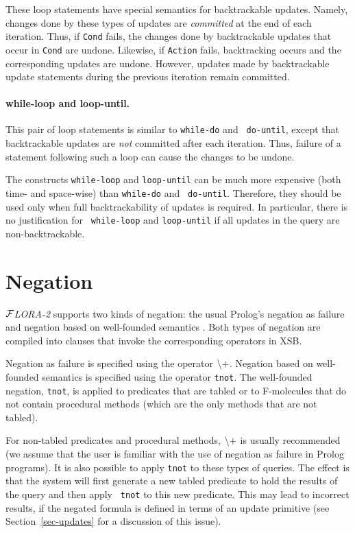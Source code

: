 \documentclass[11pt]{article}
\newcommand{\FLORA}{{\mbox{${\cal F}${\small\it LORA}\rm\emph{-2}}}\xspace}
\newcommand{\NAF}{{$\tt\backslash +$}\xspace}
\begin{document}
These loop statements have special semantics for backtrackable updates.
Namely, changes done by these types of updates are \emph{committed} at the
end of each iteration. Thus, if {\tt Cond} fails, the changes done by
backtrackable updates that occur in {\tt Cond} are undone. Likewise, if
{\tt Action} fails, backtracking occurs and the corresponding updates are
undone. However, updates made by backtrackable update statements during the
previous iteration remain committed.


\paragraph{while-loop and loop-until.}
This pair of loop statements is similar to {\tt while-do} and {\tt
  do-until}, except that backtrackable updates are \emph{not} committed
after each iteration. Thus, failure of a statement following such a loop
can cause the changes to be undone.

The constructs {\tt while-loop} and {\tt loop-until} can be much more
expensive (both time- and space-wise) than {\tt while-do} and {\tt
  do-until}. Therefore, they should be used only when full backtrackability
of updates is required. In particular, there is no justification for {\tt
  while-loop} and {\tt loop-until} if all updates in the query are
non-backtrackable.


\section{Negation} \label{sec:negation}


\FLORA supports two kinds of negation: the usual Prolog's
negation as failure \cite{Cla78} and negation based on well-founded
semantics \cite{gelder-alternating-89,gelder-ross-schlipf-91}. Both types
of negation are compiled into clauses that invoke the corresponding
operators in XSB.

Negation as failure is specified using the operator \NAF.  Negation based
on well-founded semantics is specified using the operator {\tt tnot}. The
well-founded negation, {\tt tnot}, is applied to predicates that are tabled
or to F-molecules that do not contain procedural methods (which are the
only methods that are not tabled).

For non-tabled predicates and procedural methods, \NAF is usually
recommended (we assume that the user is familiar with the use of negation
as failure in Prolog programs).  It is also possible to apply {\tt tnot} to
these types of queries.  The effect is that the system will first generate
a new tabled predicate to hold the results of the query and then apply {\tt
  tnot} to this new predicate. This may lead to incorrect results,
if the negated formula is defined in terms of an update
primitive (see Section~\ref{sec-updates} for a discussion of this issue).
\end{document}
